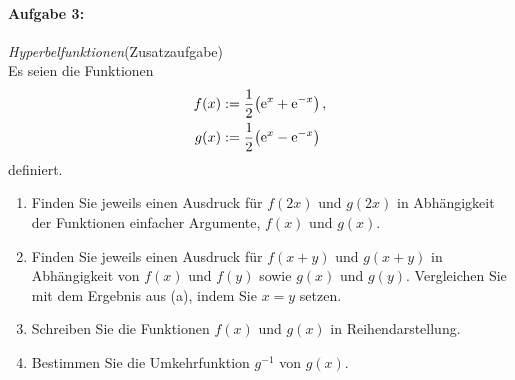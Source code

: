 \newpage
\paragraph{Aufgabe 3: } \emph{Hyperbelfunktionen}\hfill (Zusatzaufgabe)\\[0.2cm]
Es seien die Funktionen
\begin{align*}
    f(x)&:=\frac{1}{2}\qty(\mathrm{e}^{x}+\mathrm{e}^{-x})\,,\\
    g(x)&:=\frac{1}{2}\qty(\mathrm{e}^{x}-\mathrm{e}^{-x})
\end{align*}
definiert.
\begin{enumerate}[label=(\alph*)]
    \item Finden Sie jeweils einen Ausdruck für $f(2x)$ und $g(2x)$ in Abhängigkeit der Funktionen einfacher Argumente, $f(x)$ und $g(x)$.
    \item Finden Sie jeweils einen Ausdruck für $f(x+y)$ und $g(x+y)$ in Abhängigkeit von $f(x)$ und $f(y)$ sowie $g(x)$ und $g(y)$. Vergleichen Sie mit dem Ergebnis aus (a), indem Sie $x=y$ setzen.
    \item Schreiben Sie die Funktionen $f(x)$ und $g(x)$ in Reihendarstellung.
    \item Bestimmen Sie die Umkehrfunktion $g^{-1}$ von $g(x)$.
\end{enumerate}